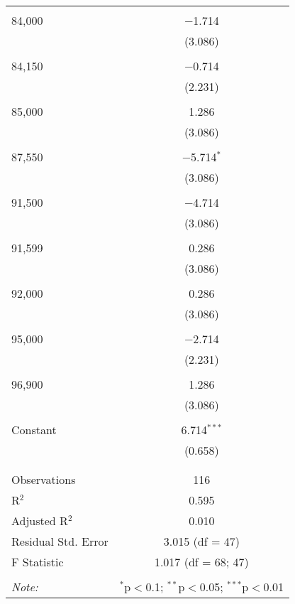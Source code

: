 \documentclass[12pt,english]{article}
\begin{document}
\begin{table}[!htbp]
\begin{tabular}{@{\extracolsep{5pt}}lc}
  & \\ 
 84,000 & $-$1.714 \\ 
  & (3.086) \\ 
  & \\ 
 84,150 & $-$0.714 \\ 
  & (2.231) \\ 
  & \\ 
 85,000 & 1.286 \\ 
  & (3.086) \\ 
  & \\ 
 87,550 & $-$5.714$^{*}$ \\ 
  & (3.086) \\ 
  & \\ 
 91,500 & $-$4.714 \\ 
  & (3.086) \\ 
  & \\ 
 91,599 & 0.286 \\ 
  & (3.086) \\ 
  & \\ 
 92,000 & 0.286 \\ 
  & (3.086) \\ 
  & \\ 
 95,000 & $-$2.714 \\ 
  & (2.231) \\ 
  & \\ 
 96,900 & 1.286 \\ 
  & (3.086) \\ 
  & \\ 
 Constant & 6.714$^{***}$ \\ 
  & (0.658) \\ 
  & \\ 
\hline \\[-1.8ex] 
Observations & 116 \\ 
R$^{2}$ & 0.595 \\ 
Adjusted R$^{2}$ & 0.010 \\ 
Residual Std. Error & 3.015 (df = 47) \\ 
F Statistic & 1.017 (df = 68; 47) \\ 
\hline 
\hline \\[-1.8ex] 
\textit{Note:}  & \multicolumn{1}{r}{$^{*}$p$<$0.1; $^{**}$p$<$0.05; $^{***}$p$<$0.01} \\ 
\end{tabular} 
\end{table} 




\end{document}
